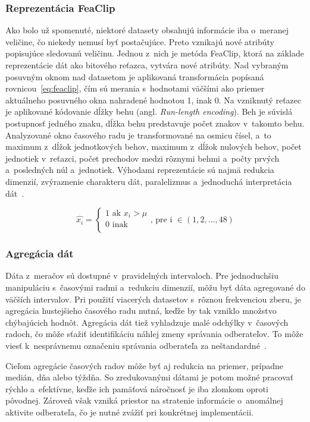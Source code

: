 \documentclass[a4paper,twoside,slovak,12pt,appendix]{article}
\begin{document}
\subsubsection{Reprezentácia FeaClip}
\label{c:feaclip-representation}
Ako bolo už spomenuté, niektoré datasety obsahujú informácie iba o~meranej
veličine, čo niekedy nemusí byť postačujúce. Preto vznikajú nové atribúty
popisujúce sledovanú veličinu. Jednou z~nich je metóda FeaClip, ktorá
na základe reprezentácie dát ako bitového reťazca, vytvára nové atribúty. Nad
vybraným posuvným oknom nad datasetom je aplikovaná transformácia popísaná
rovnicou~\ref{eq:feaclip}, čím sú merania s~hodnotami väčšími ako priemer
aktuálneho posuvného okna nahradené hodnotou 1, inak 0. Na vzniknutý reťazec je
aplikované kódovanie dĺžky behu (angl. \textit{Run-length encoding}). Beh je
súvislá postupnosť jedného znaku, dĺžka behu predstavuje počet znakov v~takomto
behu. Analyzované okno časového radu je transformované na osmicu čísel, a~to
maximum z~dĺžok jednotkových behov, maximum z~dĺžok nulových behov, počet
jednotiek v~reťazci, počet prechodov medzi rôznymi behmi a~počty prvých
a~posledných núl a~jednotiek. Výhodami reprezentácie sú najmä redukcia dimenzií,
zvýraznenie charakteru dát, paralelizmus a~jednoduchá interpretácia
dát~\cite{Laurinec2018}.

\begin{equation}
  \label{eq:feaclip}
  \hat{x_i} =
  \begin{cases}
    1 \text{ ak } x_i > \mu \\
    0 \text{ inak } \\
  \end{cases}
  \text{, pre i } \in (1, 2, ..., 48)
\end{equation}

\subsubsection{Agregácia dát}
Dáta z~meračov sú dostupné v~pravidelných intervaloch. Pre jednoduchšiu
manipuláciu s~časovými radmi a~redukciu dimenzií, môžu byť dáta agregované do
väčších intervalov. Pri použití viacerých datasetov s~rôznou frekvenciou zberu,
je agregácia hustejšieho časového radu nutná, keďže by tak vzniklo množstvo
chýbajúcich hodnôt. Agregácia dát tiež vyhladzuje malé odchýlky v~časových
radoch, čo môže sťažiť identifikáciu náhlej zmeny správania odberateľov. To môže
viesť k~nesprávnemu označeniu správania odberateľa za
neštandardné~\cite{Cody2015}.

Cieľom agregácie časových radov môže byť aj redukcia na priemer, prípadne
medián, dňa alebo týždňa. So zredukovanými dátami je potom možné pracovať rýchlo
a~efektívne, keďže ich pamäťová náročnosť je iba zlomkom oproti pôvodnej.
Zároveň však vzniká priestor na stratenie informácie o~anomálnej aktivite
odberateľa, čo je nutné zvážiť pri konkrétnej implementácii.
\end{document}
